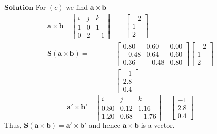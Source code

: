\documentclass{styles/kaobook}
\begin{document}
$\boxed{\textbf{Solution}}$ For $(c)$ we find $\mathbf{a} \times \mathbf{b}$
$$
\begin{aligned}
\mathbf{a} \times \mathbf{b}=\left|\begin{array}{ccc}
i & j & k \\
1 & 0 & 1 \\
0 & 2 & -1
\end{array}\right| &=\begin{bmatrix}
-2 \\
1 \\
2
\end{bmatrix} \\
\mathbf{S}(\mathbf{a} \times \mathbf{b})=&\begin{bmatrix}
0.80 & 0.60 & 0.00 \\
-0.48 & 0.64 & 0.60 \\
0.36 & -0.48 & 0.80
\end{bmatrix}\begin{bmatrix}
-2 \\
1 \\
2
\end{bmatrix} \\
=&\begin{bmatrix}
-1 \\
2.8 \\
0.4
\end{bmatrix}
\end{aligned}
$$
$$
\mathbf{a}' \times \mathbf{b}'=\left|\begin{array}{ccc}
i & j & k \\
0.80 & 0.12 & 1.16 \\
1.20 & 0.68 & -1.76
\end{array}\right|=\begin{bmatrix}
-1 \\
2.8 \\
0.4
\end{bmatrix}
$$
Thus, $\mathbf{S}(\mathbf{a} \times \mathbf{b})=\mathbf{a}' \times \mathbf{b}'$ and hence $\mathbf{a} \times \mathbf{b}$ is a vector.
\end{document}
